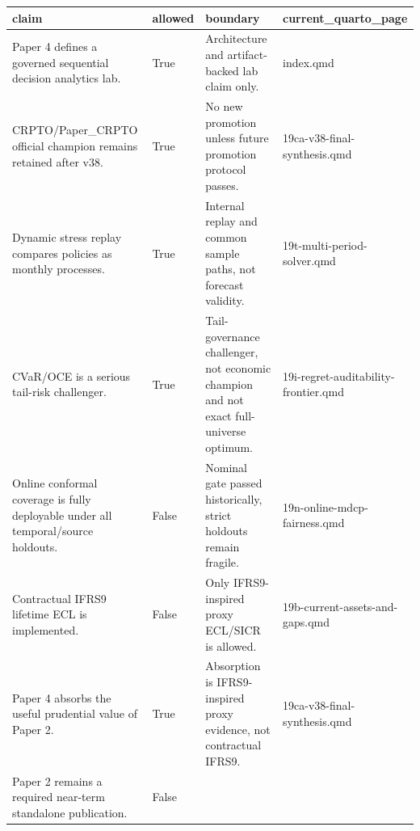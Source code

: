 \documentclass[
  spanish,
  11pt,
  letterpaper,
]{scrbook}
\newcounter{none} %
\theoremstyle{plain}
\theoremstyle{remark}
\begin{document}
{\def\LTcaptype{none} %
\begin{longtable}[]{@{}
  >{\raggedright\arraybackslash}p{}
  >{\raggedright\arraybackslash}p{}
  >{\raggedright\arraybackslash}p{}
  >{\raggedright\arraybackslash}p{}@{}}
\toprule\noalign{}
\begin{minipage}[b]{\linewidth}\raggedright
claim
\end{minipage} & \begin{minipage}[b]{\linewidth}\raggedright
allowed
\end{minipage} & \begin{minipage}[b]{\linewidth}\raggedright
boundary
\end{minipage} & \begin{minipage}[b]{\linewidth}\raggedright
current\_quarto\_page
\end{minipage} \\
\midrule\noalign{}
\endhead
\bottomrule\noalign{}
\endlastfoot
Paper 4 defines a governed sequential decision analytics lab. & True &
Architecture and artifact-backed lab claim only. & index.qmd \\
CRPTO/Paper\_CRPTO official champion remains retained after v38. & True
& No new promotion unless future promotion protocol passes. &
19ca-v38-final-synthesis.qmd \\
Dynamic stress replay compares policies as monthly processes. & True &
Internal replay and common sample paths, not forecast validity. &
19t-multi-period-solver.qmd \\
CVaR/OCE is a serious tail-risk challenger. & True & Tail-governance
challenger, not economic champion and not exact full-universe optimum. &
19i-regret-auditability-frontier.qmd \\
Online conformal coverage is fully deployable under all temporal/source
holdouts. & False & Nominal gate passed historically, strict holdouts
remain fragile. & 19n-online-mdcp-fairness.qmd \\
Contractual IFRS9 lifetime ECL is implemented. & False & Only
IFRS9-inspired proxy ECL/SICR is allowed. &
19b-current-assets-and-gaps.qmd \\
Paper 4 absorbs the useful prudential value of Paper 2. & True &
Absorption is IFRS9-inspired proxy evidence, not contractual IFRS9. &
19ca-v38-final-synthesis.qmd \\
Paper 2 remains a required near-term standalone publication. & False &

\end{longtable}}
\end{document}
